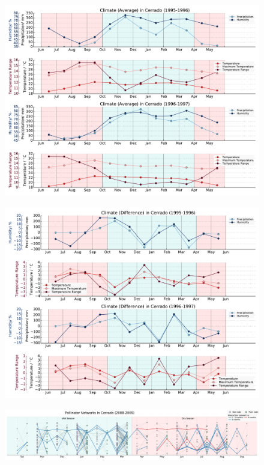 \documentclass[11pt]{article}
\begin{document}
\begin{landscape}
\begin{figure}[H]
  \centering
    \includegraphics[width=250mm]{AvgClimateAcrossTime(Old).pdf}
    \label{fig:climate1}
\end{figure}

\begin{figure}[H]
  \centering
    \includegraphics[width=250mm]{DiffClimateAcrossTime(Old).pdf}
\end{figure}

\begin{figure}[H]
  \centering
    \includegraphics[width=255mm]{network(new).pdf}
\end{figure}


\end{landscape}
\end{document}
